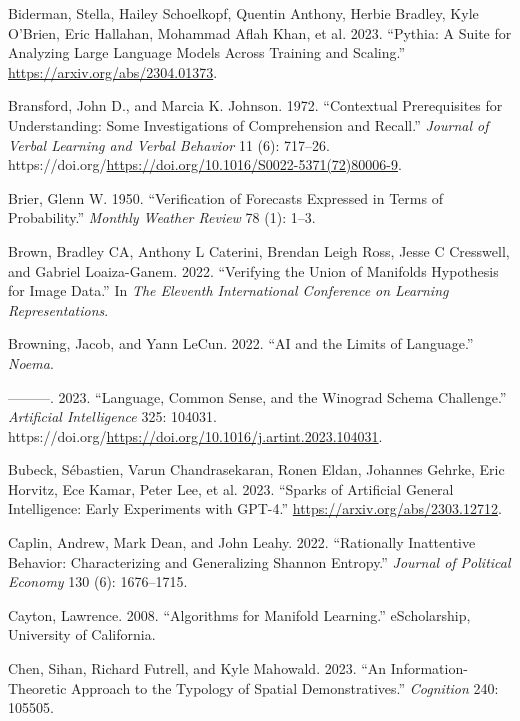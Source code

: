 \documentclass[
]{article}
\newlength{\cslhangindent}
\newenvironment{CSLReferences}[2] %
 {\begin{list}{}{%
  \setlength{\itemindent}{0pt}
  \setlength{\leftmargin}{0pt}
  \setlength{\parsep}{0pt}
  \ifodd #1
   \setlength{\leftmargin}{\cslhangindent}
   \setlength{\itemindent}{-1\cslhangindent}
  \fi
  \setlength{\itemsep}{#2\baselineskip}}}
 {\end{list}}
\begin{document}
\begin{CSLReferences}{1}{0}
Biderman, Stella, Hailey Schoelkopf, Quentin Anthony, Herbie Bradley,
Kyle O'Brien, Eric Hallahan, Mohammad Aflah Khan, et al. 2023.
{``Pythia: A Suite for Analyzing Large Language Models Across Training
and Scaling.''} \url{https://arxiv.org/abs/2304.01373}.

Bransford, John D., and Marcia K. Johnson. 1972. {``Contextual
Prerequisites for Understanding: Some Investigations of Comprehension
and Recall.''} \emph{Journal of Verbal Learning and Verbal Behavior} 11
(6): 717--26.
https://doi.org/\url{https://doi.org/10.1016/S0022-5371(72)80006-9}.

Brier, Glenn W. 1950. {``Verification of Forecasts Expressed in Terms of
Probability.''} \emph{Monthly Weather Review} 78 (1): 1--3.

Brown, Bradley CA, Anthony L Caterini, Brendan Leigh Ross, Jesse C
Cresswell, and Gabriel Loaiza-Ganem. 2022. {``Verifying the Union of
Manifolds Hypothesis for Image Data.''} In \emph{The Eleventh
International Conference on Learning Representations}.

Browning, Jacob, and Yann LeCun. 2022. {``AI and the Limits of
Language.''} \emph{Noema}.

---------. 2023. {``Language, Common Sense, and the Winograd Schema
Challenge.''} \emph{Artificial Intelligence} 325: 104031.
https://doi.org/\url{https://doi.org/10.1016/j.artint.2023.104031}.

Bubeck, Sébastien, Varun Chandrasekaran, Ronen Eldan, Johannes Gehrke,
Eric Horvitz, Ece Kamar, Peter Lee, et al. 2023. {``Sparks of Artificial
General Intelligence: Early Experiments with GPT-4.''}
\url{https://arxiv.org/abs/2303.12712}.

Caplin, Andrew, Mark Dean, and John Leahy. 2022. {``Rationally
Inattentive Behavior: Characterizing and Generalizing Shannon
Entropy.''} \emph{Journal of Political Economy} 130 (6): 1676--1715.

Cayton, Lawrence. 2008. {``Algorithms for Manifold Learning.''}
eScholarship, University of California.

Chen, Sihan, Richard Futrell, and Kyle Mahowald. 2023. {``An
Information-Theoretic Approach to the Typology of Spatial
Demonstratives.''} \emph{Cognition} 240: 105505.


\end{CSLReferences}
\end{document}
